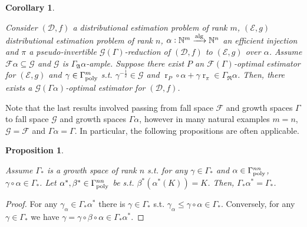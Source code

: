 \documentclass[11pt]{article}
\numberwithin{equation}{section}
\theoremstyle{definition}
\theoremstyle{plain}
\newtheorem{proposition}{Proposition}[section]
\newtheorem{corollary}{Corollary}[section]
\DeclareMathOperator{\R}{r}
\newcommand{\Nats}{\mathbb{N}}
\newcommand{\Dist}{\mathcal{D}}
\newcommand{\GrowR}{\Gamma_{\mathfrak{R}}}
\newcommand{\GrowA}{\Gamma_{\mathfrak{A}}}
\newcommand{\Fall}{\mathcal{F}}
\newcommand{\EG}{\Fall(\Gamma)}
\newcommand{\GammaPoly}{\Gamma_{\textnormal{poly}}}
\newcommand{\Alg}{\xrightarrow{\textnormal{alg}}}
\begin{document}
\begin{samepage}
\begin{corollary}
\label{crl:p_reduce}

Consider $(\Dist,f)$ a distributional estimation problem of rank ${m}$, $(\mathcal{E},g)$ distributional estimation problem of rank ${n}$, ${\alpha: \Nats^m \Alg \Nats^n}$ an efficient injection and $\pi$ a pseudo-invertible $\mathcal{G}(\Gamma)$-reduction of $(\Dist, f)$ to $(\mathcal{E}, g)$ over ${\alpha}$. Assume ${\Fall\alpha \subseteq \mathcal{G}}$ and ${\mathcal{G}}$ is ${\GrowA \alpha}$-ample. Suppose there exist ${P}$ an $\EG$-optimal estimator for $(\mathcal{E}, g)$ and ${\gamma \in \GammaPoly^m}$ s.t. ${\gamma^{-\frac{1}{2}} \in \mathcal{G}}$ and ${\R_P \circ \alpha + \gamma\R_\pi \in \GrowR \alpha}$. Then, there exists a $\mathcal{G} (\Gamma \alpha)$-optimal estimator for $(\Dist, f)$.


\end{corollary}
\end{samepage}

Note that the last results involved passing from fall space ${\Fall}$ and growth spaces ${\Gamma}$ to fall space ${\mathcal{G}}$ and growth spaces ${\Gamma \alpha}$, however in many natural examples ${m = n}$, ${\mathcal{G} = \Fall}$ and ${\Gamma \alpha = \Gamma}$. In particular, the following propositions are often applicable.

\begin{samepage}
\begin{proposition}
\label{prp:stable_growth_space}

Assume ${\Gamma_*}$ is a growth space of rank ${n}$ s.t. for any ${\gamma \in \Gamma_*}$ and ${\alpha \in \GammaPoly^{nn}}$, ${\gamma \circ \alpha \in \Gamma_*}$. Let ${\alpha^*, \beta^* \in \GammaPoly^{nn}}$ be s.t. ${\beta^*(\alpha^*(K))=K}$. Then, ${\Gamma_* \alpha^* = \Gamma_*}$.

\end{proposition}
\end{samepage}

\begin{proof}

For any ${\gamma_\alpha \in \Gamma_* \alpha^*}$ there is ${\gamma \in \Gamma_*}$ s.t. ${\gamma_\alpha \leq \gamma \circ \alpha \in \Gamma_*}$. Conversely, for any ${\gamma \in \Gamma_*}$ we have ${\gamma = \gamma \circ \beta \circ \alpha \in \Gamma_* \alpha^*}$.
%
\end{proof}
\end{document}
